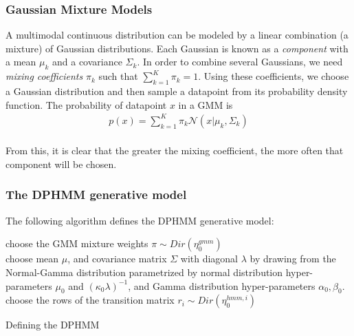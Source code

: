 \documentclass[12pt,letterpaper]{article}
\begin{document}
\subsubsection{Gaussian Mixture Models}
A multimodal continuous distribution can be modeled by a linear combination (a mixture) of Gaussian distributions. Each Gaussian is known as a \textit{component} with a mean $\mu_k$ and a covariance $\Sigma_k$. In order to combine several Gaussians, we need \textit{mixing coefficients} $\pi_k$ such that $\sum\limits_{k=1}^K \pi_k = 1$. Using these coefficients, we choose a Gaussian distribution and then sample a datapoint from its probability density function. The probability of datapoint $x$ in a GMM is\\ \begin{align}\nonumber p(x) = \sum\limits_{k=1}^K \pi_k \mathcal{N}(x|\mu_k, \Sigma_k) \end{align} \citep{bishop:2006}\\
From this, it is clear that the greater the mixing coefficient, the more often that component will be chosen. 
\subsubsection{The DPHMM generative model}
The following algorithm defines the DPHMM generative model: \\


\begin{algorithm}[H]
choose the GMM mixture weights $\pi \sim Dir(\eta_0^{gmm})$\\
choose mean $\mu$, and covariance matrix $\Sigma$ with diagonal $\lambda$ by drawing from the Normal-Gamma distribution parametrized by normal distribution hyper-parameters $\mu_0$ and $(\kappa_0\lambda)^{-1}$, and Gamma distribution hyper-parameters $\alpha_0, \beta_0$. \\

choose the rows of the transition matrix $r_i \sim Dir(\eta_0^{hmm,i})$\\

\caption{Defining the DPHMM}
\end{algorithm}
\end{document}
